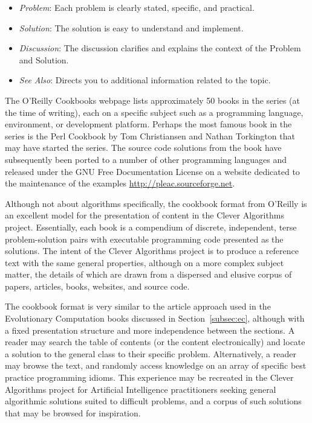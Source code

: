 \documentclass[a4paper, 11pt]{article}
\begin{document}
\begin{itemize}
	\item \emph{Problem}: Each problem is clearly stated, specific, and practical.
	\item \emph{Solution}: The solution is easy to understand and implement.
	\item \emph{Discussion}: The discussion clarifies and explains the context of the Problem and Solution.
	\item \emph{See Also}: Directs you to additional information related to the topic.
\end{itemize}

The O'Reilly Cookbooks webpage lists approximately 50 books in the series (at the time of writing), each on a specific subject such as a programming language, environment, or development platform. Perhaps the most famous book in the series is the Perl Cookbook by Tom Christiansen and Nathan Torkington \cite{Christiansen2003} that may have started the series. The source code solutions from the book have subsequently been ported to a number of other programming languages and released under the GNU Free Documentation License on a website dedicated to the maintenance of the examples \url{http://pleac.sourceforge.net}.

Although not about algorithms specifically, the cookbook format from O'Reilly is an excellent model for the presentation of content in the Clever Algorithms project. Essentially, each book is a compendium of discrete, independent, terse problem-solution pairs with executable programming code presented as the solutions.
The intent of the Clever Algorithms project is to produce a reference text with the same general properties, although on a more complex subject matter, the details of which are drawn from a dispersed and elusive corpus of papers, articles, books, websites, and source code.

The cookbook format is very similar to the article approach used in the Evolutionary Computation books discussed in Section~\ref{subsec:ec}, although with a fixed presentation structure and more independence between the sections. A reader may search the table of contents (or the content electronically) and locate a solution to the general class to their specific problem. Alternatively, a reader may browse the text, and randomly access knowledge on an array of specific best practice programming idioms.
This experience may be recreated in the Clever Algorithms project for Artificial Intelligence practitioners seeking general algorithmic solutions suited to difficult problems, and a corpus of such solutions that may be browsed for inspiration.
\end{document}
